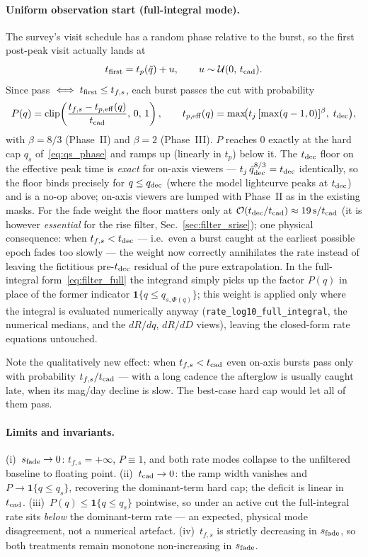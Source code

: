 \documentclass[11pt,a4paper]{article}
\begin{document}
\paragraph{Uniform observation start (full-integral mode).} The survey's visit schedule has a random phase relative to the burst, so the first post-peak visit actually lands at
\[
t_{\rm first}=t_p(\tilde q)+u,\qquad u\sim\mathcal U(0,\,t_{\rm cad}).
\]
Since pass $\iff t_{\rm first}\le t_{f,s}$, each burst passes the cut with probability
\begin{equation}
\label{eq:P_fade}
P(q)=\operatorname{clip}\!\left(\frac{t_{f,s}-t_{p,\rm eff}(q)}{t_{\rm cad}},\,0,\,1\right),\qquad
t_{p,\rm eff}(q)=\max\!\bigl(t_j\,[\max(q-1,0)]^{\beta},\;t_{\rm dec}\bigr),
\end{equation}
with $\beta=8/3$ (Phase~II) and $\beta=2$ (Phase~III). $P$ reaches $0$ exactly at the hard cap $q_s$ of~\eqref{eq:qs_phase} and ramps up (linearly in $t_p$) below it. The $t_{\rm dec}$ floor on the effective peak time is \emph{exact} for on-axis viewers --- $t_j\,\tilde q_{\rm dec}^{8/3}=t_{\rm dec}$ identically, so the floor binds precisely for $q\le q_{\rm dec}$ (where the model lightcurve peaks at $t_{\rm dec}$) and is a no-op above; on-axis viewers are lumped with Phase~II as in the existing masks. For the fade weight the floor matters only at $\mathcal O(t_{\rm dec}/t_{\rm cad})\approx 19\,\mathrm s/t_{\rm cad}$ (it is however \emph{essential} for the rise filter, Sec.~\ref{sec:filter_srise}); one physical consequence: when $t_{f,s}<t_{\rm dec}$ --- i.e.\ even a burst caught at the earliest possible epoch fades too slowly --- the weight now correctly annihilates the rate instead of leaving the fictitious pre-$t_{\rm dec}$ residual of the pure extrapolation. In the full-integral form~\eqref{eq:filter_full} the integrand simply picks up the factor $P(q)$ in place of the former indicator $\mathbf 1\{q\le q_{s,\Phi(q)}\}$; this weight is applied only where the integral is evaluated numerically anyway (\texttt{rate\_log10\_full\_integral}, the numerical medians, and the $dR/dq$, $dR/dD$ views), leaving the closed-form rate equations untouched.

Note the qualitatively new effect: when $t_{f,s}<t_{\rm cad}$ even on-axis bursts pass only with probability $t_{f,s}/t_{\rm cad}$ --- with a long cadence the afterglow is usually caught late, when its mag/day decline is slow. The best-case hard cap would let all of them pass.

\paragraph{Limits and invariants.}
(i)~$s_{\rm fade}\to 0$: $t_{f,s}=+\infty$, $P\equiv 1$, and both rate modes collapse to the unfiltered baseline to floating point.
(ii)~$t_{\rm cad}\to 0$: the ramp width vanishes and $P\to\mathbf 1\{q\le q_s\}$, recovering the dominant-term hard cap; the deficit is linear in $t_{\rm cad}$.
(iii)~$P(q)\le\mathbf 1\{q\le q_s\}$ pointwise, so under an active cut the full-integral rate sits \emph{below} the dominant-term rate --- an expected, physical mode disagreement, not a numerical artefact.
(iv)~$t_{f,s}$ is strictly decreasing in $s_{\rm fade}$, so both treatments remain monotone non-increasing in $s_{\rm fade}$.
\end{document}
